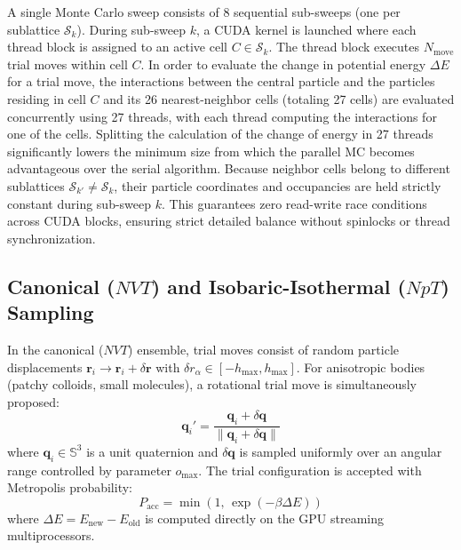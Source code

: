 \documentclass[final,5p,times,twocolumn]{elsarticle}
\begin{document}
A single Monte Carlo sweep consists of 8 sequential sub-sweeps (one
per sublattice $\mathcal{S}_k$). During sub-sweep $k$, a CUDA kernel
is launched where each thread block is assigned to an active cell $C
\in \mathcal{S}_k$. The thread block executes $N_{\text{move}}$ trial
moves within cell $C$. 
In order  to evaluate the change in potential energy $\Delta E$ for a
trial move, the interactions between the central particle and the
particles residing in cell $C$ and its 26 nearest-neighbor cells
(totaling 27 cells) are evaluated concurrently using 27 threads, with
each thread computing the interactions for one of the cells. Splitting
the calculation of 
the change of energy in 27 threads significantly lowers the minimum
size from which the parallel MC becomes advantageous over the serial
algorithm.
Because neighbor cells
belong to different sublattices $\mathcal{S}_{k'} \neq \mathcal{S}_k$,
their particle coordinates and occupancies are held strictly constant
during sub-sweep $k$. This guarantees zero read-write race conditions
across CUDA blocks, ensuring strict detailed balance without spinlocks
or thread synchronization.  

\subsection{Canonical (\texorpdfstring{$NVT$}{NVT}) and Isobaric-Isothermal (\texorpdfstring{$NpT$}{NpT}) Sampling}
\label{sec:algo_npt}

In the canonical ($NVT$) ensemble, trial moves consist of random
particle displacements $\mathbf{r}_i \to \mathbf{r}_i +
\delta\mathbf{r}$ with $\delta r_\alpha \in [-h_{\max},
  h_{\max}]$. For anisotropic bodies (patchy colloids, small
molecules), a rotational trial move is simultaneously proposed: 
\begin{equation}
    \mathbf{q}_i' = \frac{\mathbf{q}_i + \delta\mathbf{q}}{\|\mathbf{q}_i + \delta\mathbf{q}\|}
\end{equation}
where $\mathbf{q}_i \in \mathbb{S}^3$ is a unit quaternion and
$\delta\mathbf{q}$ is sampled uniformly over an angular range
controlled by parameter $o_{\max}$. The trial configuration is
accepted with Metropolis probability: 
\begin{equation}
    P_{\text{acc}} = \min\left(1, \, \exp(-\beta \Delta E)\right)
\end{equation}
where $\Delta E = E_{\text{new}} - E_{\text{old}}$ is computed
directly on the GPU streaming multiprocessors. 
\end{document}

